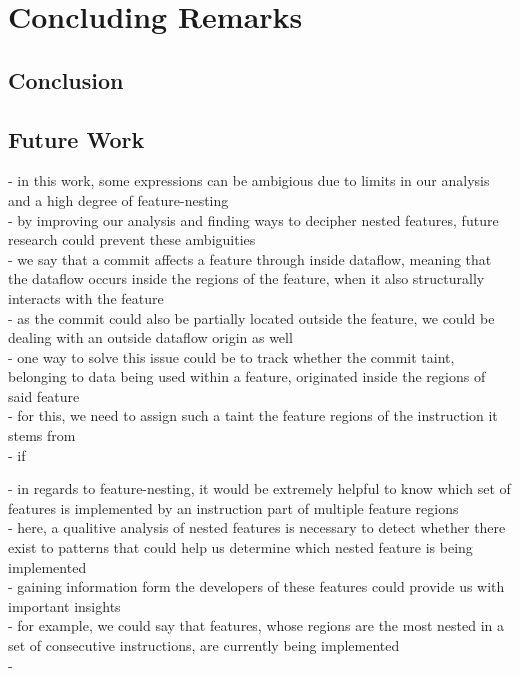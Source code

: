 \chapter{Concluding Remarks}\label{ch:conclusion}

\section{Conclusion}\label{sec:conclusion}

\section{Future Work}\label{sec:futurework}

- in this work, some expressions can be ambigious due to limits in our analysis and a high degree of feature-nesting \\
- by improving our analysis and finding ways to decipher nested features, future research could prevent these ambiguities \\
- we say that a commit affects a feature through inside dataflow, meaning that the dataflow occurs inside the regions of the feature, when it also structurally interacts with the feature \\
- as the commit could also be partially located outside the feature, we could be dealing with an outside dataflow origin as well \\
- one way to solve this issue could be to track whether the commit taint, belonging to data being used within a feature, originated inside the regions of said feature \\
- for this, we need to assign such a taint the feature regions of the instruction it stems from \\
- if 

- in regards to feature-nesting, it would be extremely helpful to know which set of features is implemented by an instruction part of multiple feature regions \\
- here, a qualitive analysis of nested features is necessary to detect whether there exist to patterns that could help us determine which nested feature is being implemented \\
- gaining information form the developers of these features could provide us with important insights \\
- for example, we could say that features, whose regions are the most nested in a set of consecutive instructions, are currently being implemented \\
-

